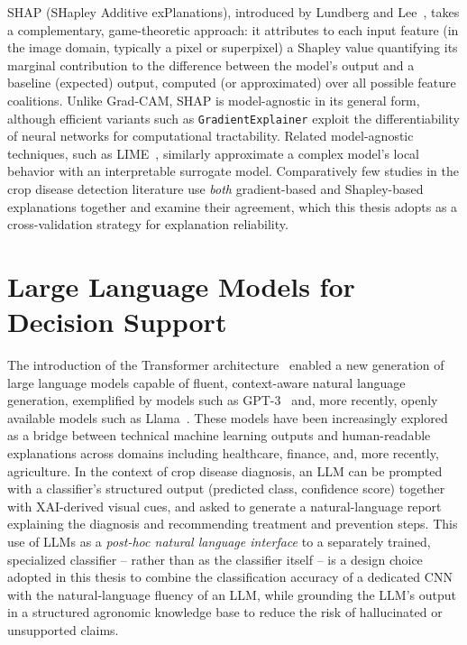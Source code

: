 \documentclass[12pt,a4paper,oneside]{report}
\begin{document}
SHAP (SHapley Additive exPlanations), introduced by Lundberg and Lee~\cite{lundberg2017shap}, takes a
complementary, game-theoretic approach: it attributes to each input feature (in the image domain, typically a
pixel or superpixel) a Shapley value quantifying its marginal contribution to the difference between the model's
output and a baseline (expected) output, computed (or approximated) over all possible feature coalitions. Unlike
Grad-CAM, SHAP is model-agnostic in its general form, although efficient variants such as \texttt{GradientExplainer}
exploit the differentiability of neural networks for computational tractability. Related model-agnostic
techniques, such as LIME~\cite{ribeiro2016lime}, similarly approximate a complex model's local behavior with an
interpretable surrogate model. Comparatively few studies in the crop disease detection literature use \emph{both}
gradient-based and Shapley-based explanations together and examine their agreement, which this thesis adopts as
a cross-validation strategy for explanation reliability.

\section{Large Language Models for Decision Support}
The introduction of the Transformer architecture~\cite{vaswani2017attention} enabled a new generation of large
language models capable of fluent, context-aware natural language generation, exemplified by models such as
GPT-3~\cite{brown2020gpt3} and, more recently, openly available models such as Llama~\cite{touvron2023llama}.
These models have been increasingly explored as a bridge between technical machine learning outputs and
human-readable explanations across domains including healthcare, finance, and, more recently, agriculture. In
the context of crop disease diagnosis, an LLM can be prompted with a classifier's structured output (predicted
class, confidence score) together with XAI-derived visual cues, and asked to generate a natural-language report
explaining the diagnosis and recommending treatment and prevention steps. This use of LLMs as a
\textit{post-hoc natural language interface} to a separately trained, specialized classifier -- rather than as
the classifier itself -- is a design choice adopted in this thesis to combine the classification accuracy of a
dedicated CNN with the natural-language fluency of an LLM, while grounding the LLM's output in a structured
agronomic knowledge base to reduce the risk of hallucinated or unsupported claims.
\end{document}
